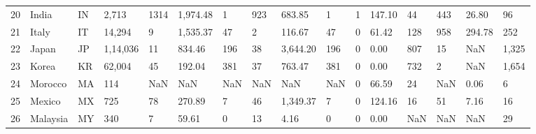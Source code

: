 \begin{tabular}{llllllllllllllll}
20 &               India &        IN  &                2,713 &            1314 &                 1,974.48 &                         1 &             923 &                   683.85 &                         1 &               1 &                   147.10 &                        44 &                 443 &                    26.80 &                        96 \\
21 &               Italy &        IT  &               14,294 &               9 &                 1,535.37 &                        47 &               2 &                   116.67 &                        47 &               0 &                    61.42 &                       128 &                 958 &                   294.78 &                       252 \\
22 &               Japan &        JP  &             1,14,036 &              11 &                   834.46 &                       196 &              38 &                 3,644.20 &                       196 &               0 &                     0.00 &                       807 &                  15 &                      NaN &                     1,325 \\
23 &               Korea &        KR  &               62,004 &              45 &                   192.04 &                       381 &              37 &                   763.47 &                       381 &               0 &                     0.00 &                       732 &                   2 &                      NaN &                     1,654 \\
24 &             Morocco &        MA  &                  114 &             NaN &                      NaN &                       NaN &             NaN &                      NaN &                       NaN &               0 &                    66.59 &                        24 &                 NaN &                     0.06 &                         6 \\
25 &              Mexico &        MX  &                  725 &              78 &                   270.89 &                         7 &              46 &                 1,349.37 &                         7 &               0 &                   124.16 &                        16 &                  51 &                     7.16 &                        16 \\
26 &            Malaysia &        MY  &                  340 &               7 &                    59.61 &                         0 &              13 &                     4.16 &                         0 &               0 &                     0.00 &                       NaN &                 NaN &                      NaN &                        29 \\

\end{tabular}
